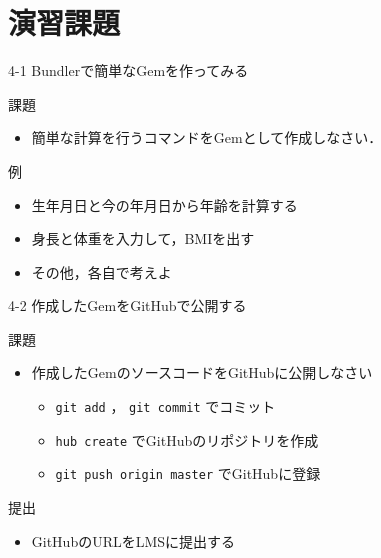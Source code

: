 \documentclass[t, aspectratio=169]{beamer}
\begin{document}
\section{演習課題}
\label{sec-4-3}
\begin{frame}[label=sec-4-3-1]{4-1 Bundlerで簡単なGemを作ってみる}
\begin{block}{課題}
\begin{itemize}
\item 簡単な計算を行うコマンドをGemとして作成しなさい．
\end{itemize}
\end{block}

\begin{block}{例}
\begin{itemize}
\item 生年月日と今の年月日から年齢を計算する
\item 身長と体重を入力して，BMIを出す
\item その他，各自で考えよ
\end{itemize}
\end{block}
\end{frame}

\begin{frame}[fragile,label=sec-4-3-2]{4-2 作成したGemをGitHubで公開する}
 \begin{block}{課題}
\begin{itemize}
\item 作成したGemのソースコードをGitHubに公開しなさい
\begin{itemize}
\item \texttt{git add} ， \texttt{git commit} でコミット
\item \texttt{hub create} でGitHubのリポジトリを作成
\item \texttt{git push origin master} でGitHubに登録
\end{itemize}
\end{itemize}
\end{block}

\begin{block}{提出}
\begin{itemize}
\item GitHubのURLをLMSに提出する
\end{itemize}
\end{block}
\end{frame}
\end{document}
